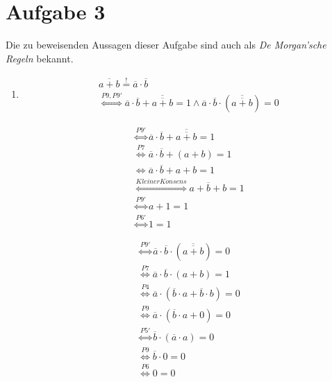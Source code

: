 \documentclass[a4paper]{article}
\begin{document}
\section*{Aufgabe 3}
	Die zu beweisenden Aussagen dieser Aufgabe sind auch als \textit{De Morgan'sche Regeln} bekannt.

\begin{enumerate}[label=\alph*)]
	\item
	\begin{equation}
	\begin{aligned}
	\overline{a + b} \stackrel{!}{=} \overline{a} \cdot \overline{b} \\
	\stackrel{P9, P9'}{\Longleftrightarrow} \overline{a} \cdot \overline{b} + \overline{\overline{a + b}} = 1 \wedge \overline{a} \cdot \overline{b} \cdot (\overline{\overline{a + b}}) = 0 
	\end{aligned}
	\end{equation}
	
	\begin{equation}
	\begin{aligned}
	\stackrel{P9'}{\Longleftrightarrow} \overline{a} \cdot \overline{b} + \overline{\overline{a+b}} = 1 \\
	\stackrel{P7}{\Longleftrightarrow} \overline{a} \cdot \overline{b} + (a + b) = 1 \\
	\Longleftrightarrow \overline{a} \cdot \overline{b} + a + b = 1 \\
	\stackrel{Kleiner Konsens}{\Longleftrightarrow} a + \overline{b} + b = 1 \\
	\stackrel{P9'}{\Longleftrightarrow} a + 1 = 1 \\
	\stackrel{P6'}{\Longleftrightarrow} 1 = 1
	\end{aligned}
	\end{equation}
	
	\begin{equation}
	\begin{aligned}
	\stackrel{P9'}{\Longleftrightarrow} \overline{a} \cdot \overline{b} \cdot (\overline{\overline{a+b}}) = 0 \\
	\stackrel{P7}{\Longleftrightarrow} \overline{a} \cdot \overline{b} \cdot (a + b) = 1 \\
	\stackrel{P4}{\Longleftrightarrow} \overline{a} \cdot (\overline{b} \cdot a + \overline{b} \cdot b) = 0
	\\
	\stackrel{P9}{\Longleftrightarrow} \overline{a} \cdot (\overline{b} \cdot a + 0) = 0
	\\
	\stackrel{P5'}{\Longleftrightarrow} \overline{b} \cdot (\overline{a} \cdot a) = 0
	\\
	\stackrel{P9}{\Longleftrightarrow} \overline{b} \cdot 0 = 0
	\\
	\stackrel{P6}{\Longleftrightarrow} 0 = 0
	\end{aligned}
	\end{equation}
\end{enumerate}
\end{document}
